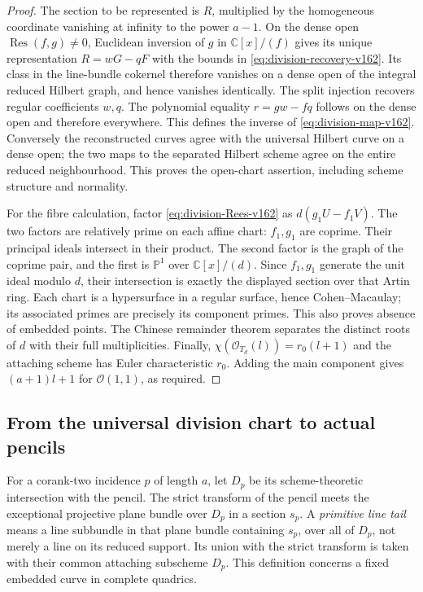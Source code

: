 \documentclass[11pt,reqno]{amsart}
\numberwithin{equation}{section}
\theoremstyle{definition}\newtheorem{definition}[theorem]{Definition}
\theoremstyle{remark}\newtheorem{remark}[theorem]{Remark}
\newcommand{\C}{\mathbb C}\newcommand{\Q}{\mathbb Q}
\newcommand{\Pj}{\mathbb P}\newcommand{\A}{\mathbb A}
\newcommand{\OO}{\mathcal O}\newcommand{\II}{\mathcal I}
\begin{document}
\begin{proof}
The section to be represented is $R$, multiplied by the homogeneous
coordinate vanishing at infinity to the power $a-1$. On the dense
open $\operatorname{Res}(f,g)\ne0$, Euclidean inversion of $g$ in
$\C[x]/(f)$ gives its unique representation $R=wG-qF$ with the
bounds in \eqref{eq:division-recovery-v162}. Its class in the
line-bundle cokernel therefore vanishes on a dense open of the
integral reduced Hilbert graph, and hence vanishes identically.
The split injection recovers regular coefficients $w,q$.
The polynomial equality $r=gw-fq$ follows on the dense open and
therefore everywhere. This defines the inverse of
\eqref{eq:division-map-v162}. Conversely the reconstructed curves
agree with the universal Hilbert curve on a dense open; the two
maps to the separated Hilbert scheme agree on the entire reduced
neighbourhood. This proves the open-chart assertion, including
scheme structure and normality.

For the fibre calculation, factor \eqref{eq:division-Rees-v162}
as $d(g_1U-f_1V)$. The two factors are relatively prime on each
affine chart: $f_1,g_1$ are coprime. Their principal ideals
intersect in their product. The second factor is the graph of the
coprime pair, and the first is $\Pj^1$ over $\C[x]/(d)$.
Since $f_1,g_1$ generate the unit ideal modulo $d$, their intersection
is exactly the displayed section over that Artin ring. Each chart
is a hypersurface in a regular surface, hence Cohen--Macaulay;
its associated primes are precisely its component primes. This
also proves absence of embedded points. The Chinese remainder
theorem separates the distinct roots of $d$ with their full
multiplicities. Finally, $\chi(\OO_{T_d}(l))=r_0(l+1)$ and the
attaching scheme has Euler characteristic $r_0$. Adding the main
component gives $(a+1)l+1$ for $\OO(1,1)$, as required.
\end{proof}

\subsection{From the universal division chart to actual pencils}
For a corank-two incidence $p$ of length $a$, let $D_p$ be its
scheme-theoretic intersection with the pencil. The strict transform
of the pencil meets the exceptional projective plane bundle over
$D_p$ in a section $s_p$. A \emph{primitive line tail} means a line
subbundle in that plane bundle containing $s_p$, over all of $D_p$,
not merely a line on its reduced support. Its union with the strict
transform is taken with their common attaching subscheme $D_p$.
This definition concerns a fixed embedded curve in complete quadrics.
\end{document}
